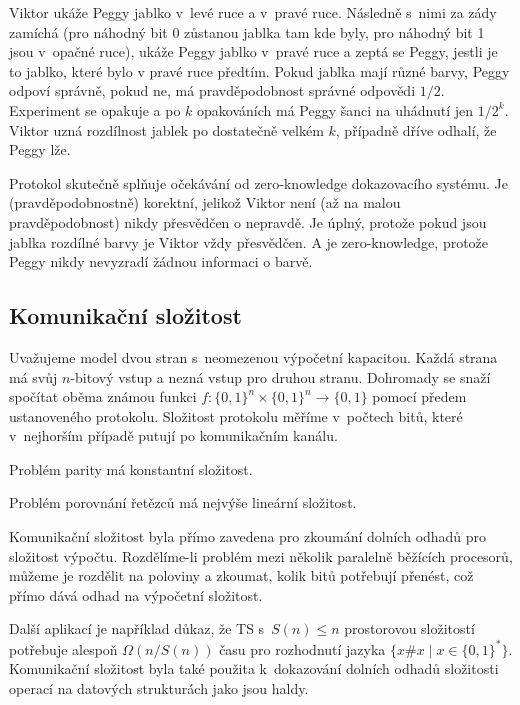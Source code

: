 Viktor ukáže Peggy jablko v~levé ruce a v~pravé ruce. Následně s~nimi
za zády zamíchá (pro náhodný bit 0 zůstanou jablka tam kde byly, pro
náhodný bit 1 jsou v~opačné ruce), ukáže Peggy jablko v~pravé ruce a
zeptá se Peggy, jestli je to jablko, které bylo v pravé ruce předtím.
Pokud jablka mají různé barvy, Peggy odpoví správně, pokud ne, má
pravděpodobnost správné odpovědi $1/2$.
Experiment se opakuje a po $k$ opakováních má Peggy šanci na uhádnutí
jen $1/2^k$. Viktor uzná rozdílnost jablek po dostatečně velkém
$k$, případně dříve odhalí, že Peggy lže.

Protokol skutečně splňuje očekávání od zero-knowledge dokazovacího
systému. Je (pravděpodobnostně) korektní, jelikož Viktor není (až na
malou pravděpodobnost) nikdy přesvědčen o nepravdě.
Je úplný, protože pokud jsou jablka rozdílné barvy je Viktor vždy
přesvědčen. A je zero-knowledge, protože Peggy nikdy nevyzradí žádnou
informaci o barvě.

\subsection{Komunikační složitost}

Uvažujeme model dvou stran s~neomezenou výpočetní kapacitou.
Každá strana má svůj $n$-bitový vstup a nezná vstup pro druhou stranu.
Dohromady se snaží spočítat oběma známou funkci
$f : \{0,1\}^n \times \{0,1\}^n \to \{0,1\}$
pomocí předem ustanoveného protokolu. Složitost protokolu měříme v~počtech
bitů, které v~nejhorším případě putují po komunikačním kanálu.

\begin{example}
Problém parity má konstantní složitost.
\end{example}

\begin{example}
Problém porovnání řetězců má nejvýše lineární složitost.
\end{example}

Komunikační složitost byla přímo zavedena pro zkoumání dolních odhadů
pro složitost výpočtu. Rozdělíme-li problém mezi několik paralelně
běžících procesorů, můžeme je rozdělit na poloviny a zkoumat, kolik bitů
potřebují přenést, což přímo dává odhad na výpočetní složitost.

Další aplikací je například důkaz, že TS s~$S(n) \leq n$ prostorovou složitostí
potřebuje alespoň $\Omega(n / S(n))$ času pro rozhodnutí jazyka
$\{ x\#x \mid x \in \{0,1\}^* \}$. Komunikační složitost byla také
použita k~dokazování dolních odhadů složitosti operací na datových
strukturách jako jsou haldy.


